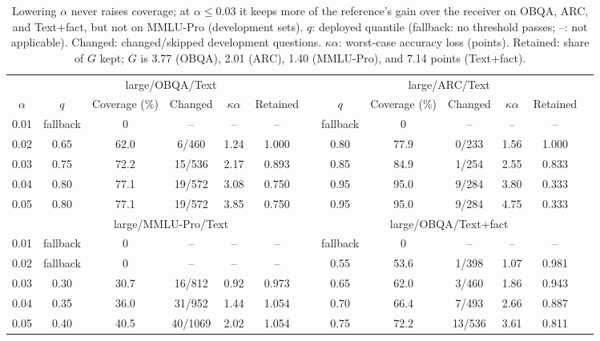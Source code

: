 \begin{table}[!htbp]\centering\scriptsize
\caption{Lowering $\alpha$ never raises coverage; at $\alpha\le0.03$ it keeps more of the reference's gain over the receiver on OBQA, ARC, and Text+fact, but not on MMLU-Pro (development sets). $q$: deployed quantile (fallback: no threshold passes; --: not applicable). Changed: changed/skipped development questions. $\kappa\alpha$: worst-case accuracy loss (points). Retained: share of $G$ kept; $G$ is 3.77 (OBQA), 2.01 (ARC), 1.40 (MMLU-Pro), and 7.14 points (Text+fact).}
\label{tab:retention}
\renewcommand{\arraystretch}{1.1}\setlength{\tabcolsep}{3pt}
\begin{tabular}{lcccccc@{\hspace{10pt}}cccccc}\toprule
& \multicolumn{5}{c}{large/OBQA/Text} & & \multicolumn{5}{c}{large/ARC/Text}\\\cmidrule(lr){2-6}\cmidrule(lr){8-12}
\multicolumn{1}{c}{$\alpha$} & $q$ & Coverage (\%) & Changed & $\kappa\alpha$ & Retained & & $q$ & Coverage (\%) & Changed & $\kappa\alpha$ & Retained\\\midrule
0.01 & fallback & 0 & -- & -- & -- & & fallback & 0 & -- & -- & --\\
0.02 & 0.65 & 62.0 & 6/460 & 1.24 & 1.000 & & 0.80 & 77.9 & 0/233 & 1.56 & 1.000\\
0.03 & 0.75 & 72.2 & 15/536 & 2.17 & 0.893 & & 0.85 & 84.9 & 1/254 & 2.55 & 0.833\\
0.04 & 0.80 & 77.1 & 19/572 & 3.08 & 0.750 & & 0.95 & 95.0 & 9/284 & 3.80 & 0.333\\
0.05 & 0.80 & 77.1 & 19/572 & 3.85 & 0.750 & & 0.95 & 95.0 & 9/284 & 4.75 & 0.333\\\midrule
& \multicolumn{5}{c}{large/MMLU-Pro/Text} & & \multicolumn{5}{c}{large/OBQA/Text+fact}\\\cmidrule(lr){2-6}\cmidrule(lr){8-12}
0.01 & fallback & 0 & -- & -- & -- & & fallback & 0 & -- & -- & --\\
0.02 & fallback & 0 & -- & -- & -- & & 0.55 & 53.6 & 1/398 & 1.07 & 0.981\\
0.03 & 0.30 & 30.7 & 16/812 & 0.92 & 0.973 & & 0.65 & 62.0 & 3/460 & 1.86 & 0.943\\
0.04 & 0.35 & 36.0 & 31/952 & 1.44 & 1.054 & & 0.70 & 66.4 & 7/493 & 2.66 & 0.887\\
0.05 & 0.40 & 40.5 & 40/1069 & 2.02 & 1.054 & & 0.75 & 72.2 & 13/536 & 3.61 & 0.811\\\bottomrule
\end{tabular}
\end{table}

